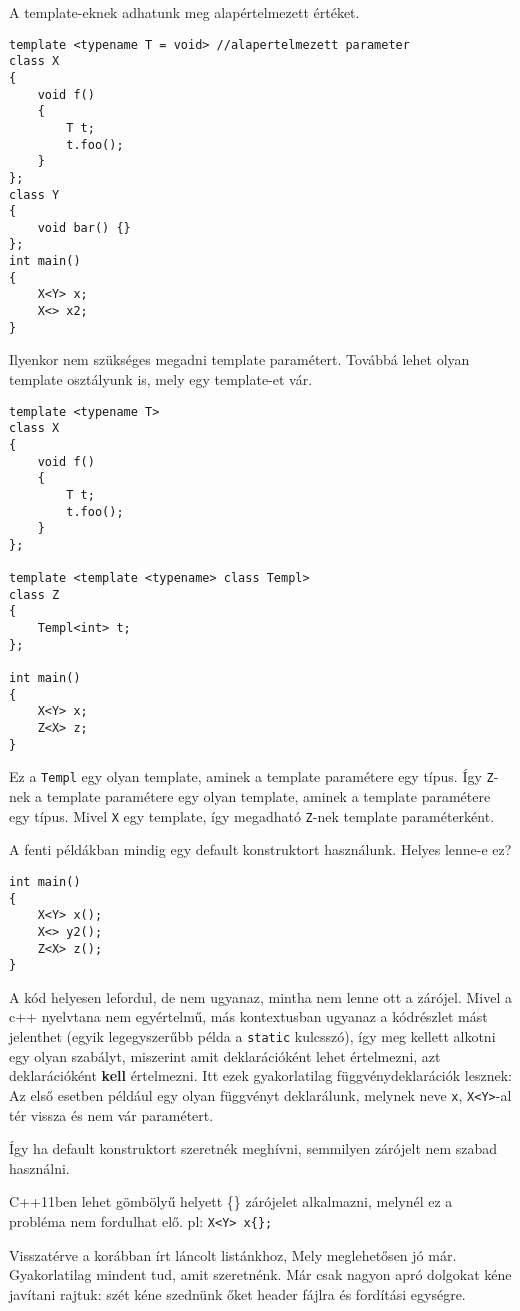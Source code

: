 \documentclass[a4paper,11.5pt]{article}
\begin{document}
	A template-eknek adhatunk meg alapértelmezett értéket.

\begin{lstlisting}
template <typename T = void> //alapertelmezett parameter
class X
{
	void f()
	{
		T t;
		t.foo();
	}
};
class Y
{
	void bar() {}
};
int main()
{
	X<Y> x;
	X<> x2;
}
\end{lstlisting}
	Ilyenkor nem szükséges megadni template paramétert. Továbbá lehet olyan template osztályunk is, mely egy template-et vár.

\begin{lstlisting}
template <typename T>
class X
{
	void f()
	{
		T t;
		t.foo();
	}
};

template <template <typename> class Templ>
class Z
{
	Templ<int> t;
};

int main()
{
	X<Y> x;
	Z<X> z;
}
\end{lstlisting}
	Ez a \texttt{Templ} egy olyan template, aminek a template paramétere egy típus. Így \texttt{Z}-nek a template paramétere egy olyan template, aminek a template paramétere egy típus. Mivel \texttt{X} egy template, így megadható \texttt{Z}-nek template paraméterként.
	\medskip
	
	A fenti példákban mindig egy default konstruktort használunk. Helyes lenne-e ez?
\begin{lstlisting}
int main()
{
	X<Y> x();
	X<> y2();
	Z<X> z();
}
\end{lstlisting}
	A kód helyesen lefordul, de nem ugyanaz, mintha nem lenne ott a zárójel. Mivel a c++ nyelvtana nem egyértelmű, más kontextusban ugyanaz a kódrészlet mást jelenthet (egyik legegyszerűbb példa a \texttt{static} kulcsszó), így meg kellett alkotni egy olyan szabályt, miszerint amit deklarációként lehet értelmezni, azt deklarációként \textbf{kell} értelmezni. Itt ezek gyakorlatilag függvénydeklarációk lesznek: Az első esetben például egy olyan függvényt deklarálunk, melynek neve \texttt{x}, \texttt{X<Y>}-al tér vissza és nem vár paramétert. 
	
	Így ha default konstruktort szeretnék meghívni, semmilyen zárójelt nem szabad használni.
	\begin{note}
		C++11ben lehet gömbölyű helyett \{\} zárójelet alkalmazni, melynél ez a probléma nem fordulhat elő. pl: \texttt{X<Y> x\{\};}
	\end{note}
	Visszatérve a korábban írt láncolt listánkhoz, Mely meglehetősen jó már. Gyakorlatilag mindent tud, amit szeretnénk. Már csak nagyon apró dolgokat kéne javítani rajtuk: szét kéne szednünk őket header fájlra és fordítási egységre. 
	
\end{document}
